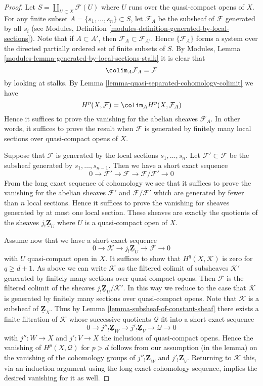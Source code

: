 \begin{proof}
Let $S = \coprod_{U \subset X} \mathcal{F}(U)$ where $U$ runs over the
quasi-compact opens of $X$.
For any finite subset $A = \{s_1, \ldots, s_n\} \subset S$,
let $\mathcal{F}_A$ be the subsheaf of $\mathcal{F}$ generated
by all $s_i$ (see
Modules, Definition \ref{modules-definition-generated-by-local-sections}).
Note that if $A \subset A'$, then $\mathcal{F}_A \subset \mathcal{F}_{A'}$.
Hence $\{\mathcal{F}_A\}$ forms a system over the directed
partially ordered set of finite subsets of $S$.
By Modules, Lemma \ref{modules-lemma-generated-by-local-sections-stalk}
it is clear that
$$
\colim_A \mathcal{F}_A = \mathcal{F}
$$
by looking at stalks. By
Lemma \ref{lemma-quasi-separated-cohomology-colimit} we have
$$
H^p(X, \mathcal{F}) =
\colim_A H^p(X, \mathcal{F}_A)
$$
Hence it suffices to prove the vanishing for the abelian sheaves
$\mathcal{F}_A$. In other words, it suffices to prove the
result when $\mathcal{F}$ is generated by finitely many local sections
over quasi-compact opens of $X$.

\medskip\noindent
Suppose that $\mathcal{F}$ is generated by the local sections
$s_1, \ldots, s_n$. Let $\mathcal{F}' \subset \mathcal{F}$
be the subsheaf generated by $s_1, \ldots, s_{n - 1}$.
Then we have a short exact sequence
$$
0 \to \mathcal{F}' \to \mathcal{F} \to \mathcal{F}/\mathcal{F}' \to 0
$$
From the long exact sequence of cohomology we see that it suffices
to prove the vanishing for the abelian sheaves $\mathcal{F}'$
and $\mathcal{F}/\mathcal{F}'$ which are generated by fewer than
$n$ local sections. Hence it suffices to prove the vanishing
for sheaves generated by at most one local section. These sheaves
are exactly the quotients of the sheaves $j_!\underline{\mathbf{Z}}_U$
where $U$ is a quasi-compact open of $X$.

\medskip\noindent
Assume now that we have a short exact sequence
$$
0 \to \mathcal{K} \to j_!\underline{\mathbf{Z}}_U \to \mathcal{F} \to 0
$$
with $U$ quasi-compact open in $X$.
It suffices to show that $H^q(X, \mathcal{K})$ is zero for $q \geq d + 1$.
As above we can write $\mathcal{K}$ as the filtered colimit of
subsheaves $\mathcal{K}'$ generated by finitely many sections over
quasi-compact opens. Then $\mathcal{F}$ is the filtered colimit of the
sheaves $j_!\underline{\mathbf{Z}}_U/\mathcal{K}'$. In this way we
reduce to the case that $\mathcal{K}$ is generated by finitely many
sections over quasi-compact opens. Note that $\mathcal{K}$
is a subsheaf of $\underline{\mathbf{Z}}_X$. Thus by
Lemma \ref{lemma-subsheaf-of-constant-sheaf} there exists a finite
filtration of $\mathcal{K}$ whose successive quotients $\mathcal{Q}$ fit
into a short exact sequence
$$
0 \to j''_!\underline{\mathbf{Z}}_W \to
j'_!\underline{\mathbf{Z}}_V \to \mathcal{Q} \to 0
$$
with $j'' : W \to X$ and $j' : V \to X$ the inclusions of quasi-compact opens.
Hence the vanishing of $H^p(X, \mathcal{Q})$ for $p > d$ follows
from our assumption (in the lemma) on the vanishing of the cohomology groups
of $j''_!\underline{\mathbf{Z}}_W$ and $j'_!\underline{\mathbf{Z}}_V$.
Returning to $\mathcal{K}$ this, via an induction argument using the
long exact cohomology sequence, implies the desired vanishing for it as well.
\end{proof}

